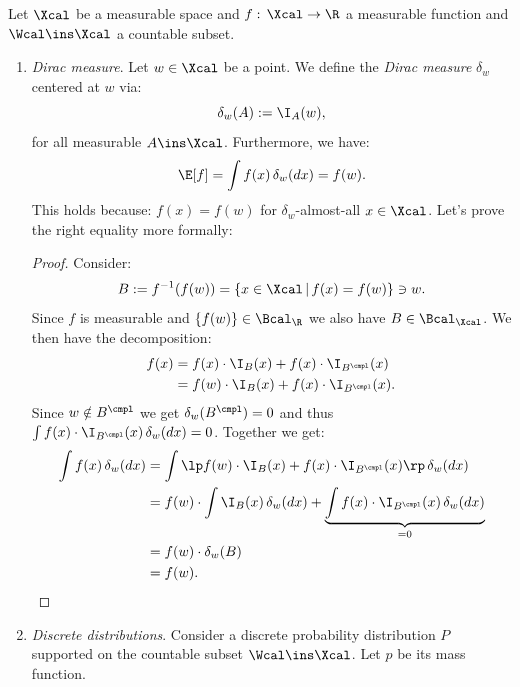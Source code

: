 \begin{Eg} Let $\Xcal$ be a measurable space and $f:\,\Xcal \to \R$ a measurable function and $\Wcal \ins \Xcal$ a countable subset.
    \begin{enumerate}
        \item \emph{Dirac measure}. Let $w \in \Xcal$ be a point. We define the \emph{Dirac measure} $\delta_{w}$ centered at $w$ via:
            \[ \delta_{w}(A) := \I_A(w),\]
            for all measurable $A \ins \Xcal$. Furthermore, we have:
            \[ \E[f] =  \int f(x)\,\delta_{w}(dx)   = f(w).\]
            This holds because: $f(x) = f(w)$ for $\delta_{w}$-almost-all $x \in \Xcal$.
            Let's prove the right equality more formally:
            \begin{proof}
            Consider:
            \[B:= f^{-1}(f(w))=\{x \in \Xcal\,|\,f(x)=f(w) \} \ni w.\]
            Since $f$ is measurable and $\{f(w)\} \in \Bcal_{\R}$ we also have $B \in \Bcal_\Xcal$.
            We then have the decomposition:
            \begin{align*}
                f(x) &= f(x) \cdot \I_B(x) + f(x) \cdot \I_{B^\cmpl}(x) \\
                &= f(w) \cdot \I_B(x) + f(x) \cdot \I_{B^\cmpl}(x).
        \end{align*}
        Since $w \notin B^\cmpl$ we get $\delta_{w}(B^\cmpl) =0$ and thus $\int f(x) \cdot \I_{B^\cmpl}(x)\, \delta_{w}(dx) = 0$.
        Together we get:
        \begin{align*}
            \int f(x)\,\delta_{w}(dx) & =  \int \lp f(w) \cdot \I_B(x) + f(x) \cdot \I_{B^\cmpl}(x) \rp \, \delta_{w}(dx) \\
            & =  f(w) \cdot \int  \I_B(x)\,\delta_{w}(dx) + \underbrace{\int  f(x) \cdot \I_{B^\cmpl}(x)  \, \delta_{w}(dx)}_{=0} \\
            & = f(w) \cdot \delta_{w}(B) \\
            & = f(w).
        \end{align*}
            \end{proof}
        \item \emph{Discrete distributions}. Consider a discrete probability distribution $P$ supported on the countable subset $\Wcal \ins \Xcal$. 
            Let $p$ be its mass function.

\end{enumerate}
\end{Eg}
